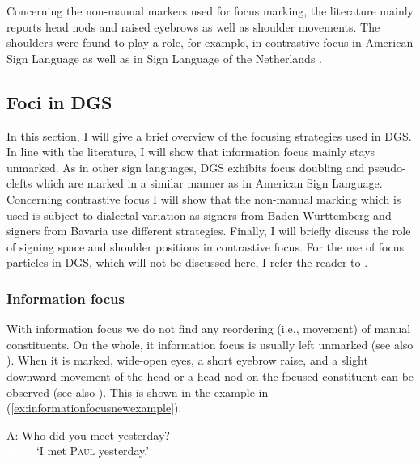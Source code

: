 Concerning the non-manual markers used for focus marking, the literature mainly reports head nods and raised eyebrows  as well as shoulder movements. The shoulders were found to play a role, for example, in contrastive focus in American Sign Language \citep{wilbur1999syntactic} as well as in Sign Language of the Netherlands \citep{crasborn2013phonology}.

\subsection{Foci in DGS}
In this section, I will give a brief overview of the focusing strategies used in DGS. In line with the literature, I will show that information focus mainly stays unmarked. As in other sign languages, DGS exhibits focus doubling and pseudo-clefts which are marked in a similar manner as in American Sign Language. Concerning contrastive focus I will show that the non-manual marking which is used is subject to dialectal variation as signers from Baden-Württemberg and signers from Bavaria use different strategies. Finally, I will briefly discuss the role of signing space and shoulder positions in contrastive focus. For the use of focus particles in DGS, which will not be discussed here, I refer the reader to \citet{herrmann2013modal}.

\subsubsection{Information focus}
With information focus we do not find any reordering (i.e., movement) of manual constituents. On the whole, it information focus is usually left unmarked (see also \citealt{waleschkowski2009}). When it is marked, wide-open eyes, a short eyebrow raise, and a slight downward movement of the head or a head-nod on the focused constituent can be observed (see also \citealt[396]{happ2014vork}). This is shown in the example in (\ref{ex:informationfocusnewexample}).

\begin{exe}
\ex\label{ex:informationfocusnewexample}
A: Who did you meet yesterday?\\
\textcolor{white}{B: }  
\glt \textcolor{white}{B: }`I met \textsc{Paul} yesterday.' 
\end{exe}

